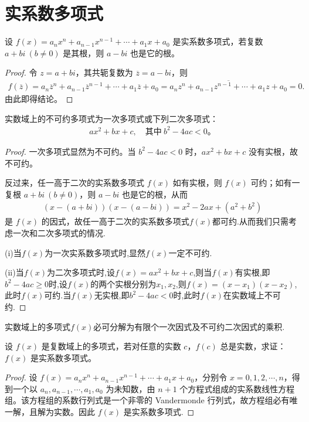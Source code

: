 \documentclass[../../main.tex]{subfiles}
\begin{document}
\section{实系数多项式}

\begin{theorem}[实系数多项式的复根成对出现]\label{theorem:实系数多项式的复根成对出现}
设 $f(x) = a_n x^n + a_{n-1} x^{n-1} + \cdots + a_1 x + a_0$ 是实系数多项式，若复数 $a + bi \ (b \neq 0)$ 是其根，则 $a - bi$ 也是它的根。
\end{theorem}
\begin{proof}
令 $z = a + bi$，其共轭复数为 $\overline{z} = a - bi$，则
\begin{align*}
f(\overline{z})=a_n\overline{z}^n+a_{n-1}\overline{z}^{n-1}+\cdots +a_1\overline{z}+a_0=\overline{a_nz^n+a_{n-1}z^{n-1}+\cdots +a_1z+a_0}=0.
\end{align*}
由此即得结论。
\end{proof}

\begin{corollary}
实数域上的不可约多项式为一次多项式或下列二次多项式：
\begin{align*}
ax^2 + bx + c, \quad \text{其中} \ b^2 - 4ac < 0。
\end{align*}
\end{corollary}
\begin{proof}
一次多项式显然为不可约。当 $b^2 - 4ac < 0$ 时，$ax^2 + bx + c$ 没有实根，故不可约。

反过来，任一高于二次的实系数多项式 $f(x)$ 如有实根，则 $f(x)$ 可约；如有一复根 $a + bi \ (b \neq 0)$，则 $a - bi$ 也是它的根，从而
\begin{align*}
(x - (a + bi))(x - (a - bi)) = x^2 - 2ax + (a^2 + b^2)
\end{align*}
是 $f(x)$ 的因式，故任一高于二次的实系数多项式$f(x)$都可约.从而我们只需考虑一次和二次多项式的情况.

(i)当$f(x)$为一次实系数多项式时,显然$f(x)$一定不可约.

(ii)当$f(x)$为二次多项式时,设$f(x)=ax^2+bx+c$,则当$f(x)$有实根,即$b^2-4ac\geq 0$时,设$f(x)$的两个实根分别为$x_1,x_2$,则$f(x)=(x-x_1)(x-x_2)$,此时$f(x)$可约.当$f(x)$无实根,即$b^2-4ac<0$时,此时$f(x)$在实数域上不可约.
\end{proof}

\begin{corollary}
实数域上的多项式$f(x)$必可分解为有限个一次因式及不可约二次因式的乘积.
\end{corollary}

\begin{proposition}\label{proposition:实系数多项式的判定条件}
设 $f(x)$ 是复数域上的多项式，若对任意的实数 $c$，$f(c)$ 总是实数，求证：$f(x)$ 是实系数多项式。
\end{proposition}
\begin{proof}
设 $f(x) = a_n x^n + a_{n-1} x^{n-1} + \cdots + a_1 x + a_0$，分别令 $x = 0, 1, 2, \cdots, n$，得到一个以 $a_n, a_{n-1}, \cdots, a_1, a_0$ 为未知数，由 $n + 1$ 个方程式组成的实系数线性方程组。该方程组的系数行列式是一个非零的 Vandermonde 行列式，故方程组必有唯一解，且解为实数。因此 $f(x)$ 是实系数多项式.
\end{proof}
\end{document}
